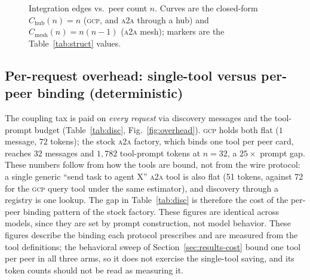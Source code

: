 \documentclass[conference,letterpaper]{IEEEtran}
\newcommand{\gcp}{\textsc{gcp}}
\newcommand{\ata}{\textsc{a2a}}
\newcommand{\bigoh}{\mathcal{O}}
\begin{document}
\begin{figure}[H]
\centering
{}
\caption{Integration edges vs.\ peer count $n$. Curves are the closed-form
$C_{\text{hub}}(n)=n$ (\gcp{}, and \ata{} through a hub) and $C_{\text{mesh}}(n)=n(n{-}1)$ (\ata{} mesh); markers are the Table~\ref{tab:struct} values.}
\label{fig:coupling}
\end{figure}

\subsection{Per-request overhead: single-tool versus per-peer binding (deterministic)}
The coupling tax is paid on \emph{every request} via discovery messages and the tool-prompt budget
(Table~\ref{tab:disc}, Fig.~\ref{fig:overhead}). \gcp{} holds both flat ($1$ message, $72$ tokens);
the stock \ata{} factory, which binds one tool per peer card, reaches $32$ messages and $1{,}782$ tool-prompt tokens at $n{=}32$, a $25\times$ prompt gap. These numbers follow from how the tools are bound, not from the wire protocol: a single generic ``send task to agent X'' \ata{} tool is also flat (51 tokens, against 72 for the \gcp{} query tool under the same estimator), and discovery through a registry is one lookup. The gap in Table~\ref{tab:disc} is therefore the cost of the per-peer binding pattern of the stock factory. These figures are identical across models, since they are set by prompt construction, not model behavior. These figures describe the binding each protocol prescribes and are measured from the tool definitions; the behavioral sweep of Section~\ref{sec:results-cost} bound one tool per peer in all three arms, so it does not exercise the single-tool saving, and its token counts should not be read as measuring it.
\end{document}
